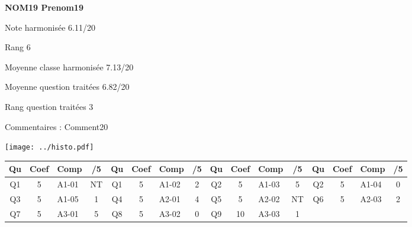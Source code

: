 \begin{minipage}[c]{.45\linewidth} 
\Large \textbf{\textsf{NOM19 Prenom19}} 
 
 \normalsize Note harmonisée 6.11/20 
 
Rang 6
 
Moyenne classe harmonisée 7.13/20 
 
Moyenne question traitées 6.82/20 
 
Rang question traitées 3 
 
Commentaires : 
Comment20 
\end{minipage}\hfill 
\begin{minipage}[c]{.45\linewidth}  
\begin{center}
\texttt{[image: ../histo.pdf]} 
\end{center}
\end{minipage}
\footnotesize 
\begin{center} 
\begin{tabular}{|c|c|m{1cm}|c||c|c|m{1cm}|c||c|c|m{1cm}|c||c|c|m{1cm}|c|} 
\hline \textbf{Qu} & \textbf{Coef} & \textbf{Comp} & \textbf{/5} & \textbf{Qu} & \textbf{Coef} & \textbf{Comp} & \textbf{/5} & \textbf{Qu} & \textbf{Coef} & \textbf{Comp} & \textbf{/5} & \textbf{Qu} & \textbf{Coef} & \textbf{Comp} & \textbf{/5} \\ 
\hline 
\hline 
Q1 & 5 & A1-01 & NT & Q1 & 5 & A1-02 & 2 & Q2 & 5 & A1-03 & 5 & Q2 & 5 & A1-04 & 0 \\ \hline 
 
Q3 & 5 & A1-05 & 1 & Q4 & 5 & A2-01 & 4 & Q5 & 5 & A2-02 & NT & Q6 & 5 & A2-03 & 2 \\ \hline 
 
Q7 & 5 & A3-01 & 5 & Q8 & 5 & A3-02 & 0 & Q9 & 10 & A3-03 & 1 &  &  &  &  \\ \hline 
 
\end{tabular} 
\end{center} 
\normalsize 
 
